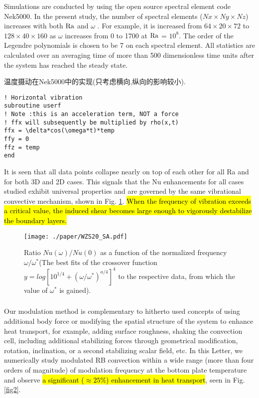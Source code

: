 \documentclass{hmj}
\newcommand\Ra{\mbox{\textrm{Ra}}} %
\begin{document}
Simulations are conducted by using the open source spectral element code Nek5000. In the present study, the number of spectral elements ($Nx \times Ny\times Nz$) increases with both $\Ra$ and $\omega$ . For example, it is increased from $64 \times 20\times 72$ to $128\times 40\times 160$ as {\color{red}$\omega$ increases from 0 to 1700} at $\Ra$ = $10^8$. The order of the Legendre polynomials is chosen to be 7 on each spectral element. All statistics are calculated over an averaging time of more than 500 dimensionless time units after the system has reached the steady state.

温度摄动在Nek5000中的实现(只考虑横向,纵向的影响较小).
\begin{tcolorbox}[colback=black!5!white,colframe=white]
\begin{lstlisting}[frame=lrtb]
! Horizontal vibration
subroutine userf
! Note :this is an acceleration term, NOT a force
! ffx will subsequently be multiplied by rho(x,t)
ffx = \delta*cos(\omega*t)*temp
ffy = 0
ffz = temp
end
\end{lstlisting}
\end{tcolorbox}
 
 It is seen that all data points collapse nearly on top of each other for all Ra and for both 3D and 2D cases. This signals that the Nu enhancements for all cases studied exhibit universal properties and are governed by the same vibrational convective mechanism, shown in Fig. \ref{fig1}. \hl{When the frequency of vibration exceeds a critical value, the induced shear becomes large enough to vigorously destabilize the boundary layers. }

\begin{figure}
  \centering
  \centering
  \texttt{[image: ./paper/WZS20\_SA.pdf]}
  \renewcommand{\figurename}{Figure}
  \caption{Ratio $Nu(\omega)/Nu(0)$ as a function of the normalized frequency $\omega /\omega^*$(The best fits of the crossover function $y = log [10^{1/4} + (\omega/\omega^*)^{a/4}]^4$ to the respective data, from which the value of $\omega^*$ is gained).}
  \renewcommand{\figurename}{图}
\label{fig1}
\end{figure}
 
 \subsubsection{\cite{Yang2020}}
 Our modulation method is complementary to hitherto used concepts of using additional body force or modifying the spatial structure of the system to enhance heat transport, for example, adding surface roughness, shaking the convection cell, including additional stabilizing forces through geometrical modification, rotation, inclination, or a second stabilizing scalar field, etc.
 In this Letter, we numerically study modulated RB convection within a wide range (more than four orders of magnitude) of modulation frequency at the bottom plate temperature and observe \hl{a significant ($\approx 25\%$) enhancement in heat transport}, seen in Fig. \ref{fig2}.
 
\end{document}
